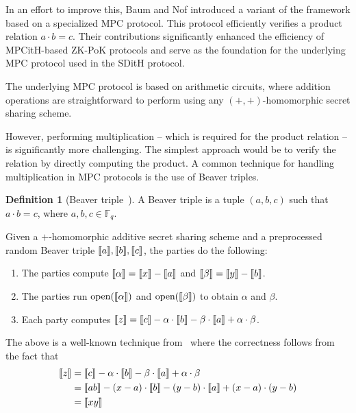 \documentclass[11pt]{report}
\theoremstyle{definition}
\newtheorem{definition}{Definition}[section]
\theoremstyle{plain}
\begin{document}
In an effort to improve this, Baum and Nof introduced a variant of the framework based on a specialized MPC protocol. This protocol efficiently verifies a product relation $a \cdot b = c$. Their contributions significantly enhanced the efficiency of MPCitH-based ZK-PoK protocols and serve as the foundation for the underlying MPC protocol used in the SDitH protocol.

The underlying MPC protocol is based on arithmetic circuits, where addition operations are straightforward to perform using any $(+,+)$-homomorphic secret sharing scheme.

However, performing multiplication -- which is required for the product relation -- is significantly more challenging. The simplest approach would be to verify the relation by directly computing the product. A common technique for handling multiplication in MPC protocols is the use of Beaver triples.

\begin{definition}[Beaver triple~\cite{Beaver1992efficient}]\label{def:Beaver}
  A Beaver triple is a tuple $ (a, b, c) $ such that $ a \cdot b = c $, where $ a, b, c \in \mathbb{F}_q $.
\end{definition}

\begin{protocol}\label{def:Beaver-multiplication}
  Given a $+$-homomorphic additive secret sharing scheme and a preprocessed random Beaver triple $\llbracket a \rrbracket, \llbracket b \rrbracket, \llbracket c \rrbracket $, the parties do the following:
  \begin{enumerate}[parsep=0pt, itemsep=0pt, topsep=0pt]
    \item The parties compute $ \llbracket \alpha \rrbracket = \llbracket x \rrbracket - \llbracket a \rrbracket $ and $ \llbracket \beta \rrbracket = \llbracket y \rrbracket - \llbracket b \rrbracket $.
    \item The parties run $ \text{open}(\llbracket \alpha \rrbracket) $ and $ \text{open}(\llbracket \beta \rrbracket) $ to obtain $ \alpha $ and $ \beta $.
    \item Each party computes $ \llbracket z \rrbracket = \llbracket c \rrbracket - \alpha \cdot \llbracket b \rrbracket - \beta \cdot \llbracket a \rrbracket + \alpha \cdot \beta $.
  \end{enumerate}
\end{protocol}


The above is a well-known technique from~\cite{Beaver1992efficient} where the correctness follows from the fact that
\begin{align*}
  \llbracket z \rrbracket & = \llbracket c \rrbracket - \alpha \cdot \llbracket b \rrbracket - \beta \cdot \llbracket a \rrbracket + \alpha \cdot \beta        \\
         & = \llbracket ab \rrbracket - (x - a) \cdot \llbracket b \rrbracket - (y - b) \cdot \llbracket a \rrbracket + (x - a) \cdot (y - b) \\
         & = \llbracket xy \rrbracket
\end{align*}
\end{document}
